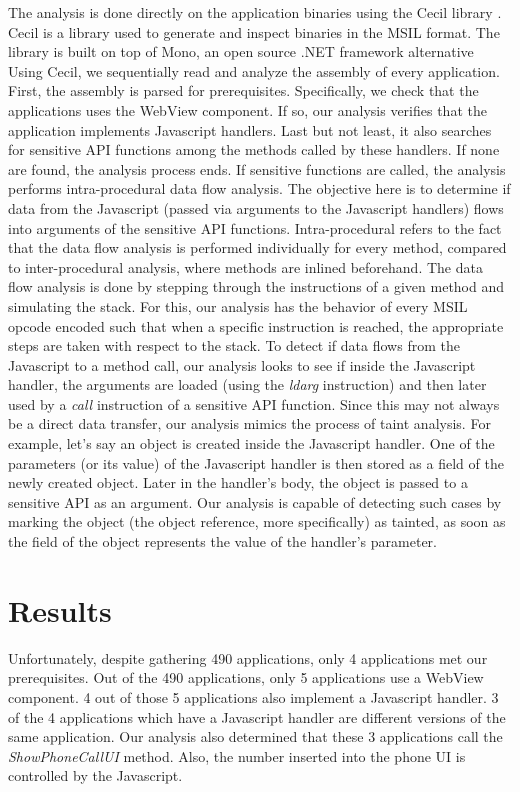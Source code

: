 \documentclass[conference]{IEEEtran}
\begin{document}
The analysis is done directly on the application binaries using the Cecil library \cite{cecil}.
Cecil is a library used to generate and inspect binaries in the MSIL format.
The library is built on top of Mono, an open source .NET framework alternative \cite{mono}
Using Cecil, we sequentially read and analyze the assembly of every application.
First, the assembly is parsed for prerequisites.
Specifically, we check that the applications uses the WebView component.
If so, our analysis verifies that the application implements Javascript handlers.
Last but not least, it also searches for sensitive API functions among the methods called by these handlers.
If none are found, the analysis process ends.
If sensitive functions are called, the analysis performs intra-procedural data flow analysis.
The objective here is to determine if data from the Javascript (passed via arguments to the Javascript handlers) flows into arguments of the sensitive API functions.
Intra-procedural refers to the fact that the data flow analysis is performed individually for every method, compared to inter-procedural analysis, where methods are inlined beforehand.
The data flow analysis is done by stepping through the instructions of a given method and simulating the stack.
For this, our analysis has the behavior of every MSIL opcode encoded such that when a specific instruction is reached, the appropriate steps are taken with respect to the stack.
To detect if data flows from the Javascript to a method call, our analysis looks to see if inside the Javascript handler, the arguments are loaded (using the \textit{ldarg} instruction) and then later used by a \textit{call} instruction of a sensitive API function.
Since this may not always be a direct data transfer, our analysis mimics the process of taint analysis.
For example, let's say an object is created inside the Javascript handler.
One of the parameters (or its value) of the Javascript handler is then stored as a field of the newly created object.
Later in the handler's body, the object is passed to a sensitive API as an argument.
Our analysis is capable of detecting such cases by marking the object (the object reference, more specifically) as tainted, as soon as the field of the object represents the value of the handler's parameter.

\section{Results}

Unfortunately, despite gathering 490 applications, only 4 applications met our prerequisites.
Out of the 490 applications, only 5 applications use a WebView component.
4 out of those 5 applications also implement a Javascript handler.
3 of the 4 applications which have a Javascript handler are different versions of the same application.
Our analysis also determined that these 3 applications call the \textit{ShowPhoneCallUI} method.
Also, the number inserted into the phone UI is controlled by the Javascript.
\end{document}
